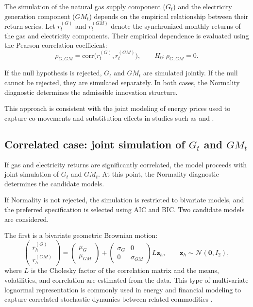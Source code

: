 \documentclass[authoryear,preprint,review,10pt]{elsarticle}
\begin{document}
The simulation of the natural gas supply component ($G_t$) and the electricity generation component ($GM_t$) depends on the empirical relationship between their return series. Let $r_t^{(G)}$ and $r_t^{(GM)}$ denote the synchronized monthly returns of the gas and electricity components. Their empirical dependence is evaluated using the Pearson correlation coefficient:
\begin{equation}
    \rho_{G,GM} = \mathrm{corr}\bigl(r_t^{(G)}, r_t^{(GM)}\bigr), 
    \qquad H_0: \rho_{G,GM} = 0.
\end{equation}

If the null hypothesis is rejected, $G_t$ and $GM_t$ are simulated jointly. If the null cannot be rejected, they are simulated separately. In both cases, the Normality diagnostic determines the admissible innovation structure.

This approach is consistent with the joint modeling of energy prices used to capture co-movements and substitution effects in studies such as \citet{tan2010day} and \citet{ibrahim2021geometric}.

\subsection{Correlated case: joint simulation of $G_t$ and $GM_t$}
\label{appendix:dependent_cases}

If gas and electricity returns are significantly correlated, the model proceeds with joint simulation of $G_t$ and $GM_t$. At this point, the Normality diagnostic determines the candidate models.

If Normality is not rejected, the simulation is restricted to bivariate models, and the preferred specification is selected using AIC and BIC. Two candidate models are considered.

The first is a bivariate geometric Brownian motion:
\begin{equation}
        \begin{pmatrix} r_h^{(G)} \\ r_h^{(GM)} \end{pmatrix}
        =
        \begin{pmatrix} \mu_G \\ \mu_{GM} \end{pmatrix}
        +
        \begin{pmatrix} \sigma_G & 0 \\ 0 & \sigma_{GM} \end{pmatrix}
        L \mathbf{z}_h,\qquad \mathbf{z}_h \sim \mathcal{N}(\mathbf{0}, I_2),
\end{equation}
where $L$ is the Cholesky factor of the correlation matrix and the means, volatilities, and correlation are estimated from the data. This type of multivariate lognormal representation is commonly used in energy and financial modeling to capture correlated stochastic dynamics between related commodities \citep{ibrahim2021geometric}.
\end{document}
